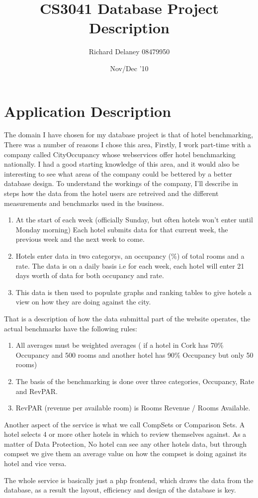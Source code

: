 \documentclass{article}
\title{ CS3041 Database Project Description}
\author{ Richard Delaney 08479950}
\date{ Nov/Dec '10}
\begin{document}
 \maketitle 


\section*{ Application Description}


The domain I have chosen for my database project is that of hotel benchmarking, There was a number of reasons I chose this area, Firstly, I work part-time with a company called CityOccupancy whose webservices offer hotel benchmarking nationally. I had a good starting knowledge of this area, and it would also be interesting to see what areas of the company could be bettered by a better database design. To understand the workings of the company, I'll describe in steps how the data from the hotel users are retreived and the different measurements and benchmarks used in the business.



\begin{enumerate}
\item  At the start of each week (officially Sunday, but often hotels won't enter until Monday morning) Each hotel submits data for that current week, the previous week and the next week to come.
\item  Hotels enter data in two categorys, an occupancy (\%) of total rooms and a rate. The data is on a daily basis i.e for each week, each hotel will enter 21 days worth of data for both occupancy and rate. 
\item  This data is then used to populate graphs and ranking tables to give hotels a view on how they are doing against the city.
\end{enumerate}


That is a description of how the data submittal part of the website operates, the actual benchmarks have the following rules:



\begin{enumerate}
\item  All averages must be weighted averages ( if a hotel in Cork has 70\% Occupancy and 500 rooms and another hotel has 90\% Occupancy but only 50 rooms)
\item  The basis of the benchmarking is done over three categories, Occupancy, Rate and RevPAR.
\item  RevPAR (revenue per available room) is Rooms Revenue / Rooms Available.
\end{enumerate}


Another aspect of the service is what we call CompSets or Comparison Sets. A hotel selects 4 or more other hotels in which to review themselves against. As a matter of Data Protection, No hotel can see any other hotels data, but through compset we give them an average value on how the compset is doing against its hotel and vice versa.



The whole service is basically just a php frontend, which draws the data from the database, as a result the layout, efficiency and design of the database is key. 
\end{document}
